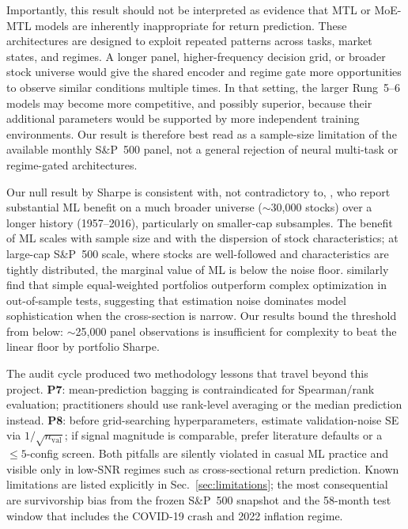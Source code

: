 \documentclass[11pt]{article}
\begin{document}
Importantly, this result should not be interpreted as evidence that MTL
or MoE-MTL models are inherently inappropriate for return prediction.
These architectures are designed to exploit repeated patterns across
tasks, market states, and regimes. A longer panel, higher-frequency
decision grid, or broader stock universe would give the shared encoder
and regime gate more opportunities to observe similar conditions
multiple times. In that setting, the larger Rung~5--6 models may become
more competitive, and possibly superior, because their additional
parameters would be supported by more independent training environments.
Our result is therefore best read as a sample-size limitation of the
available monthly S\&P~500 panel, not a general rejection of neural
multi-task or regime-gated architectures.

Our null result by Sharpe is consistent with, not contradictory to,
\citet{gu_kelly_xiu}, who report substantial ML benefit on a much
broader universe ($\sim$30{,}000 stocks) over a longer history
(1957--2016), particularly on smaller-cap subsamples. The benefit of
ML scales with sample size and with the dispersion of stock
characteristics; at large-cap S\&P~500 scale, where stocks are
well-followed and characteristics are tightly distributed, the marginal
value of ML is below the noise floor.
\citet{demiguel_compare} similarly find that simple equal-weighted
portfolios outperform complex optimization in out-of-sample tests,
suggesting that estimation noise dominates model sophistication when
the cross-section is narrow. Our results bound the threshold from
below: $\sim$25{,}000 panel observations is insufficient for complexity
to beat the linear floor by portfolio Sharpe.

The audit cycle produced two methodology lessons that travel beyond
this project. \textbf{P7}: mean-prediction bagging is contraindicated
for Spearman/rank evaluation; practitioners should use rank-level
averaging or the median prediction instead.
\textbf{P8}: before grid-searching hyperparameters, estimate
validation-noise SE via $1/\sqrt{n_{\text{val}}}$; if signal magnitude
is comparable, prefer literature defaults or a $\le 5$-config screen.
Both pitfalls are silently violated in casual ML practice and visible
only in low-SNR regimes such as cross-sectional return prediction.
Known limitations are listed explicitly in
Sec.~\ref{sec:limitations}; the most consequential are survivorship
bias from the frozen S\&P~500 snapshot and the 58-month test window
that includes the COVID-19 crash and 2022 inflation regime.
\end{document}
